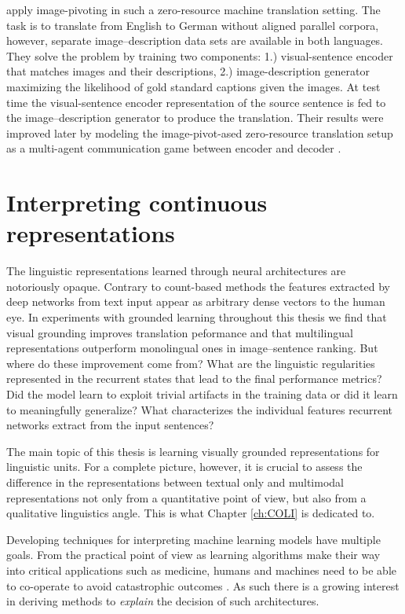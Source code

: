 \cite{nakayama2017zero} apply image-pivoting in such a zero-resource machine
translation setting. The task is to translate from English to German without
aligned parallel corpora, however, separate image--description data sets are
available in both languages. They solve the problem by
training two components: 1.) visual-sentence encoder that matches images and their descriptions,
2.) image-description generator maximizing the likelihood of gold standard captions given the images.
At test time the visual-sentence encoder representation of the source sentence is fed to the
image--description generator to produce the translation.
Their results were improved later by modeling
the image-pivot-ased zero-resource translation setup as a
multi-agent communication game between encoder and decoder
\citep{chen2018zero,lee2017emergent}.


\section{Interpreting continuous representations}
\label{sec:interpret}
The linguistic representations learned through neural architectures are notoriously opaque.
Contrary to count-based methods the features extracted by deep networks from text input
appear as arbitrary dense vectors to the human eye.
In experiments with grounded learning throughout this thesis we find that visual grounding
improves translation peformance and that multilingual representations outperform monolingual
ones in image--sentence ranking.
But where do these improvement come from? What are the linguistic
regularities represented in the recurrent states that lead to the final performance metrics?
Did the model learn to exploit trivial artifacts in the training data or did it learn to meaningfully generalize?
What characterizes the individual features recurrent networks extract from the input sentences?

The main topic of this thesis is learning visually grounded representations for linguistic units.
For a complete picture, however, it is crucial to assess the difference in the representations
between textual only and multimodal representations not only from a quantitative point of view,
but also from a qualitative linguistics angle.
This is what Chapter \ref{ch:COLI} is dedicated to.

Developing techniques for interpreting machine learning models have multiple goals.
From the practical point of view as learning algorithms make their way into critical applications
such as medicine, humans and machines need to be able to co-operate to avoid catastrophic
outcomes \citep{caruana2015intelligible}. As such there is a growing interest in deriving methods
to \emph{explain} the decision of such architectures.

